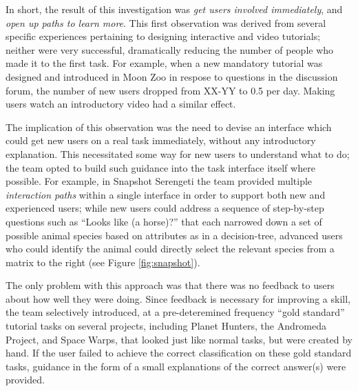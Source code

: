 \documentclass{sigchi}
\begin{document}

In short, the result of this investigation was \emph{get users involved immediately}, and \emph{open up paths to learn more}.  This first observation was derived from several specific experiences pertaining to designing interactive and video tutorials; neither were very successful, dramatically reducing the number of people who made it to the first task.  For example, when a new mandatory tutorial was designed and introduced in Moon Zoo in respose to questions in the discussion forum, the number of new users dropped from XX-YY to 0.5 per day.  Making users watch an introductory video had a similar effect.

The implication of this observation was the need to devise an interface which could get new users on a real task immediately, without any introductory explanation.  This necessitated some way for new users to understand what to do; the team opted to build such guidance into the task interface itself where possible.  For example, in Snapshot Serengeti the team provided multiple \emph{interaction paths} within a single interface in order to support both new and experienced users; while new users could address a sequence of step-by-step questions such as ``Looks like (a horse)?'' that each narrowed down a set of possible animal species based on attributes as in a decision-tree, advanced users who could identify the animal could directly select the relevant species from a matrix to the right (see Figure \ref{fig:snapshot}).

The only problem with this approach was that there was no feedback to users about how well they were doing.  Since feedback is necessary for improving a skill, the team selectively introduced, at a pre-deteremined frequency ``gold standard''  tutorial tasks on several projects, including Planet Hunters, the Andromeda Project, and Space Warps, that looked just like normal tasks, but were created by hand.  If the user failed to achieve the correct classification on these gold standard tasks, guidance in the form of a small explanations of the correct answer(s) were provided.   
\end{document}
